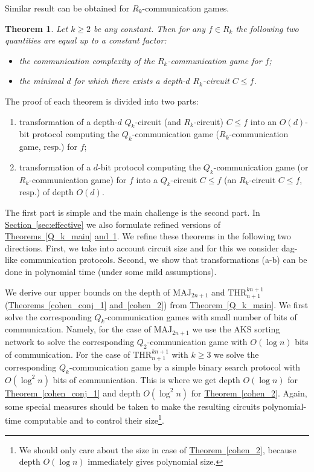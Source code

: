 \documentclass[11pt]{article}
\numberwithin{equation}{section}
\newtheorem{theorem}{Theorem}[section]
\theoremstyle{definition}
\theoremstyle{plain}
\newcommand{\expref}[2]{\hyperref[#2]{#1~\ref{#2}}}
\def\MAJ{\mathrm{MAJ}}
\def\THR{\mathrm{THR}}
\begin{document}
 Similar result can be obtained for $R_k$-communication games.

\begin{theorem}
\label{R_k_main}
Let $k \ge 2$ be any constant. Then for any $f\in R_k$ the following two quantities are equal up to a constant factor:
\begin{itemize}
\item the communication complexity of the $R_k$-communication game for $f$;
\item the minimal $d$ for which there exists a
%
depth-$d$   %
$R_k$-circuit $C \le f$.
\end{itemize}
\end{theorem}

%
The proof of each theorem is divided into two parts: %
\begin{enumerate}[label=(\alph*)]
\item  transformation of a depth-$d$ $Q_k$-circuit 
%
(and $R_k$-circuit)  %
$C \le f$ into an $O(d)$-bit protocol computing the $Q_k$-communication 
%
game ($R_k$-communication game, resp.) for $f$;  %
\item  transformation of a $d$-bit protocol computing the
$Q_k$-communication game (or $R_k$-communication game)
for $f$ into %
a $Q_k$-circuit $C\le f$
(an $R_k$-circuit $C\le f$, resp.) %
of depth $O(d)$.  %
\end{enumerate}

The first part is simple and the main challenge is the second part. In \expref{Section}{sec:effective} %
%
%
we also formulate refined versions of \expref{Theorems}{Q_k_main} \expref{and}{R_k_main}. %
We  %
refine these theorems in the following two directions.
%
First,  %
we take into account circuit size and for this we consider dag-like communication protocols.  %
Second,  %
we show that transformations (a-b) can be done in polynomial time (under some mild assumptions). 

 We derive our  upper bounds on the depth of $\MAJ_{2n + 1}$ and $\THR^{kn + 1}_{n + 1}$ (\expref{Theorems}{cohen_conj_1} \expref{and}{cohen_2}) from \expref{Theorem}{Q_k_main}. We first solve the corresponding $Q_k$-communication games with small number of bits of communication. Namely, for the case of $\MAJ_{2n + 1}$ we use the AKS sorting network to solve the corresponding $Q_2$-communication game with $O(\log n)$ bits of communication. For the case of $\THR^{kn + 1}_{n + 1}$ with $k\ge 3$ we solve the corresponding $Q_k$-communication game by a simple binary search protocol with $O(\log^2 n)$ bits of communication. This is where we get depth $O(\log n)$ for \expref{Theorem}{cohen_conj_1} and depth $O(\log^2 n)$ for \expref{Theorem}{cohen_2}. Again, some special measures should be taken to make the resulting circuits polynomial-time computable and to control their size\footnote{We should only care about the size in case of \expref{Theorem}{cohen_2}, because depth $O(\log n)$ immediately gives polynomial size.}.
\end{document}
